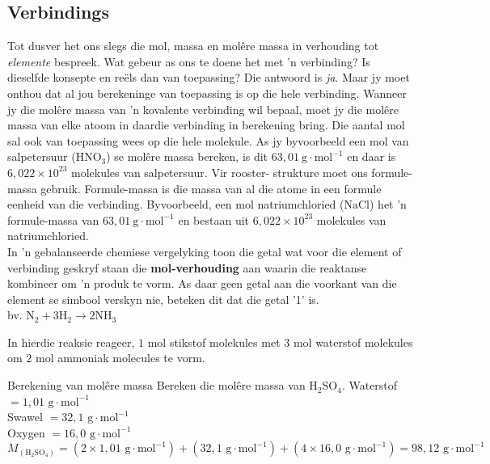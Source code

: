             \subsection*{Verbindings}
            \nopagebreak
Tot dusver het ons slegs die mol, massa en mol\^{e}re massa in verhouding tot \textsl{elemente} bespreek. Wat gebeur as ons te doene het met 'n verbinding? Is dieselfde konsepte en re\"{e}ls dan van toepassing? Die antwoord is \textsl{ja}. Maar jy moet onthou dat al jou berekeninge van toepassing is op die hele verbinding. Wanneer jy die mol\^{e}re massa van 'n kovalente verbinding wil bepaal, moet jy die mol\^{e}re massa van elke atoom in daardie verbinding in berekening bring. Die aantal mol sal ook van toepassing wees op die hele molekule. As jy byvoorbeeld een mol van salpetersuur ($\text{HNO}_{3}$) se molêre massa bereken, is dit $63,01~\text{g}\cdot{\text{mol}}^{-1}$ en daar is $6,022 \times 10^{23}$ molekules van salpetersuur. Vir rooster- strukture moet ons formule-massa gebruik. Formule-massa is die massa van al die atome in een formule eenheid van die verbinding. Byvoorbeeld, een mol natriumchloried ($\text{NaCl}$) het 'n formule-massa van  $63,01~\text{g}\cdot{\text{mol}}^{-1}$ en bestaan uit $6,022 \times 10^{23}$ molekules van natriumchloried.\\
In 'n gebalanseerde chemiese vergelyking toon die getal wat voor die element of verbinding geskryf staan die \textbf{mol-verhouding} aan  waarin die reaktanse kombineer om 'n produk te vorm. As daar geen getal aan die voorkant van die element se simbool verskyn nie, beteken dit dat die getal '1' is.\\
      \label{m38717*id278442}bv. ${\text{N}}_{2}+3{\text{H}}_{2}\to 2\text{N}{\text{H}}_{3}$\par 
      \label{m38717*id278488}In hierdie reaksie reageer, $1$ mol stikstof molekules met $3$ mol waterstof molekules om $2$ mol  ammoniak molecules te vorm.
\label{m38717*secfhsst!!!underscore!!!id566}
      \begin{wex}{Berekening van mol\^{e}re massa}{
      \label{m38717*probfhsst!!!underscore!!!id567}
      \label{m38717*id278505}Bereken die molêre massa van $\text{H}_{2}\text{SO}_{4}$.
      }
{
Waterstof $=1,01 \text{ g} \cdot \text{mol}^{-1}$ \\ 
Swawel $=32,1\text{ g} \cdot \text{mol}^{-1}$ \\
Oxygen $=16,0 \text{ g} \cdot \text{mol}^{-1}$ 
      \label{m38717*id278632}\nopagebreak\noindent{}
    \begin{equation*}
    {M}_{(\text{H}_{2}\text{SO}_{4})}=(2 \times 1,01 \text{ g} \cdot \text{mol}^{-1}) + (32,1 \text{ g} \cdot \text{mol}^{-1}) + (4 \times 16,0 \text{ g} \cdot \text{mol}^{-1} ) = 98,12 \text{ g} \cdot \text{mol}^{-1}
      \end{equation*}
}
    \end{wex}
    \noindent

